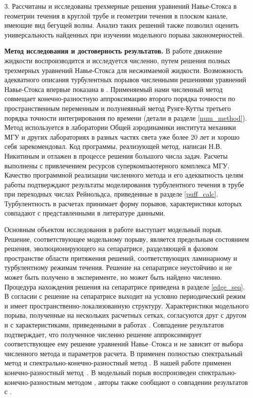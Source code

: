  $3.$  Рассчитаны и исследованы трехмерные решения уравнений Навье-Стокса в геометрии течения в круглой трубе и геометрии течения в плоском канале, имеющие вид бегущей волны. Анализ таких решений также позволил оценить универсальность найденных при изучении модельного порыва закономерностей. 

{\bf Метод исследования и достоверность результатов.}
В работе движение жидкости воспроизводится и исследуется численно, путем решения полных трехмерных уравнений Навье-Стокса для несжимаемой жидкости. Возможность адекватного описания турбулентных порывов численными решениями уравнений Навье-Стокса впервые показана в \cite{Priymak2004}. Применяемый нами численный метод совмещает конечно-разностную аппроксимацию второго порядка точности по пространственным переменным и полунеявный метод Рунге-Кутты третьего порядка точности интегрирования по времени \cite{Nikitin2006, Nikitin2006third} (детали в разделе \ref{num_method}). Метод используется в лаборатории Общей аэродинамики института механики МГУ и других лабораториях в разных частях света уже более 20 лет и хорошо себя зарекомендовал. Код программы, реализующей метод, написан Н.В.\,Никитиным и отлажен в процессе решения большого числа задач. Расчеты выполнены с привлечением ресурсов суперкомпьютерного комплекса МГУ. Качество программной реализации численного метода и его адекватность целям работы подтверждают результаты моделирования турбулентного течения в трубе при переходных числах Рейнольдса, приведенные в разделе \ref{puff_calc}. Турбулентность в расчетах принимает форму порывов, характеристики которых совпадают с представленными в литературе данными. 

Основным объектом исследования в работе выступает модельный порыв. Решение, соответствующее модельному порыву, является предельным состоянием решения, эволюционирующего на сепаратрисе, разделяющей в фазовом пространстве области притяжения решений, соответствующих ламинарному и турбулентному режимам течения. Решение на сепаратрисе неустойчиво и не может быть получено в эксперименте, но может быть найдено численно. Процедура нахождения решения на сепаратрисе приведена в разделе \ref{edge_seq}. В согласии с \cite{Avila2013} решение на сепаратрисе выходит на условно периодический режим и имеет пространственно-локализованную структуру. Характеристики модельного порыва, полученные на нескольких расчетных сетках, согласуются друг с другом и с характеристиками, приведенными в работах \cite{Avila2013, Chantry2014}. Совпадение результатов подтверждает, что полученное численно решение аппроксимирует соответствующее ему решение уравнений Навье--Стокса и не зависит от выбора численного метода и параметров расчета. В \cite{Avila2013} применен полностью спектральный метод \cite{Meseguer2007} и спектрально-конечно-разностный метод \cite{Willis2009}. В нашей работе применен конечно-разностный метод~\cite{Nikitin2006}. В \cite{Chantry2014} модельный порыв воспроизведен спектрально-конечно-разностным методом \cite{Willis2009}, авторы также сообщают о совпадении результатов с \cite{Avila2013}. 

